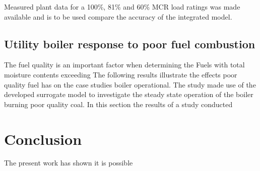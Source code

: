 \documentclass[a4paper,fleqn]{cas-sc}
\begin{document}
Measured plant data for a 100\%, 81\% and 60\% MCR load ratings was made available and is to be used compare the accuracy of the integrated model.
\subsection{Utility boiler response to poor fuel combustion}
The fuel quality is an important factor when determining the 
Fuels with total moisture contents exceeding 
The following results illustrate the effects poor quality fuel has on the case studies boiler operational. The study made use of the developed surrogate model to investigate the steady state operation of the boiler burning poor quality coal.  
In this section the results of a study conducted  
\section{Conclusion}

The present work has shown it is possible
\printcredits

%




\bio{}
\endbio

\end{document}
